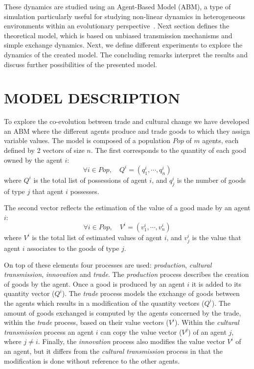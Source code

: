 \documentclass{wscpaperproc}
\begin{document}
These dynamics are studied using an Agent-Based Model (ABM), a type of simulation particularly useful for studying non-linear dynamics in heterogeneous environments within an evolutionary perspective~\cite{lake_trends_2014}. Next section defines the theoretical model, which is based on unbiased transmission mechanisms and simple exchange dynamics. Next, we define different experiments to explore the dynamics of the created model. The concluding remarks interpret the results and discuss further possibilities of the presented model.

\section{MODEL DESCRIPTION}

To explore the co-evolution between trade and cultural change we have developed an ABM where the different agents produce and trade goods to which they assign variable values. The model is composed of a population $Pop$ of $m$ agents, each defined by 2 vectors of size $n$. The first corresponds to the quantity of each good owned by the agent $i$: 
$$\forall i \in Pop, \quad Q^i = (q^i_1,\cdots,q^i_n) $$
where $Q^i$ is the total list of possessions of agent $i$, and $q^i_j$ is the number of goods of type $j$ that agent $i$ possesses.

The second vector reflects the estimation of the value of a good made by an agent $i$:
$$\forall i \in Pop, \quad V^i = (v^i_1,\cdots,v^i_n) $$
where $V^i$ is the total list of estimated values of agent $i$, and $v^i_j$ is the value that agent $i$ associates to the goods of type $j$.

On top of these elements four processes are used: \emph{production}, \emph{cultural transmission}, \emph{innovation} and \emph{trade}. The \emph{production} process describes the creation of goods by the agent. Once a good is produced by an agent $i$ it is added to its quantity vector ($Q^i$). The \emph{trade} process models the exchange of goods between the agents which results in a modification of the quantity vectors ($Q^i$). The amount of goods exchanged is computed by the agents concerned by the trade, within the \emph{trade} process, based on their value vectors ($V^i$). Within the \emph{cultural transmission} process an agent $i$ can copy the value vector ($V^j$) of an agent $j$, where $j \neq i$. Finally, the \textit{innovation} process also modifies the value vector $V^i$ of an agent, but it differs from the \emph{cultural transmission} process in that the modification is done without reference to the other agents.
\end{document}
